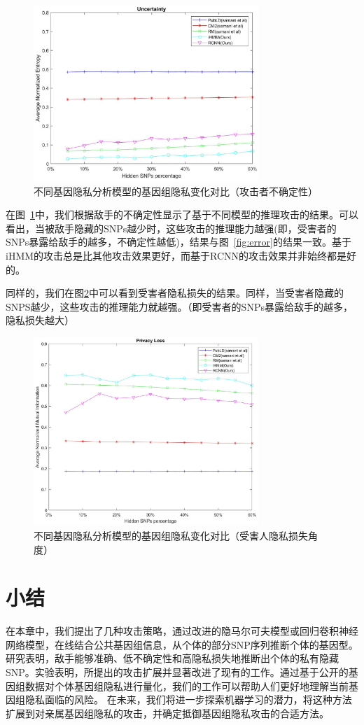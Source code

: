 \begin{figure}
	\centering
	\includegraphics[width = 8.5cm]{./figures/Fig6-genomic-privacy-quantifying-uncertainty.eps}
	\caption{不同基因隐私分析模型的基因组隐私变化对比（攻击者不确定性）}
	\label{fig:uncertainty}
\end{figure}

在图~\ref{fig:uncertainty}中，我们根据敌手的不确定性显示了基于不同模型的推理攻击的结果。可以看出，当被敌手隐藏的SNPs越少时，这些攻击的推理能力越强(即，受害者的SNPs暴露给敌手的越多，不确定性越低)，结果与图~\ref{fig:error}的结果一致。基于iHMM的攻击总是比其他攻击效果更好，而基于RCNN的攻击效果并非始终都是好的。

同样的，我们在图\ref{fig:privacyloss}中可以看到受害者隐私损失的结果。同样，当受害者隐藏的SNPS越少，这些攻击的推理能力就越强。（即受害者的SNPs暴露给敌手的越多，隐私损失越大）

\begin{figure}
	\centering
	\includegraphics[width = 8.5cm]{./figures/Fig7-genomic-privacy-quantifying-privacyloss.eps}
	\caption{不同基因隐私分析模型的基因组隐私变化对比（受害人隐私损失角度）}
	\label{fig:privacyloss}
\end{figure}


\section{小结}\label{sec:concl}

在本章中，我们提出了几种攻击策略，通过改进的隐马尔可夫模型或回归卷积神经网络模型，在线结合公共基因组信息，从个体的部分SNP序列推断个体的基因型。研究表明，敌手能够准确、低不确定性和高隐私损失地推断出个体的私有隐藏SNP。实验表明，所提出的攻击扩展并显著改进了现有的工作。通过基于公开的基因组数据对个体基因组隐私进行量化，我们的工作可以帮助人们更好地理解当前基因组隐私面临的风险。
在未来，我们将进一步探索机器学习的潜力，将这种方法扩展到对亲属基因组隐私的攻击，并确定抵御基因组隐私攻击的合适方法。